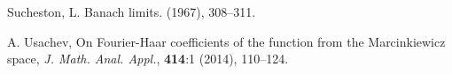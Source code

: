 \documentclass[12pt]{article}
\begin{document}
\begin{thebibliography}{10}
{\sc Sucheston, L.}
\newblock Banach limits.
 (1967), 308--311.

{A. Usachev},
{On Fourier-Haar coefficients of the function from the Marcinkiewicz space},
\newblock \textit{J. Math. Anal. Appl.}, \textbf{414}:1 (2014), 110--124.



%



\end{thebibliography}
\end{document}
